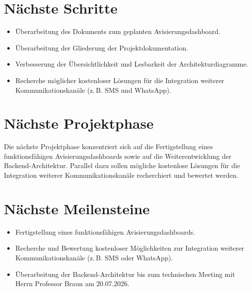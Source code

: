 \documentclass[a4paper,11pt]{article}
\begin{document}
\vspace{0.5cm}

\section{Nächste Schritte}

\begin{itemize}[leftmargin=1.2cm]

\item Überarbeitung des Dokuments zum geplanten Avisierungsdashboard.

\item Überarbeitung der Gliederung der Projektdokumentation.

\item Verbesserung der Übersichtlichkeit und Lesbarkeit der Architekturdiagramme.

\item Recherche möglicher kostenloser Lösungen für die Integration weiterer Kommunikationskanäle (z.\,B. SMS und WhatsApp).

\end{itemize}

\vspace{0.5cm}

\section{Nächste Projektphase}

Die nächste Projektphase konzentriert sich auf die Fertigstellung eines funktionsfähigen Avisierungsdashboards sowie auf die Weiterentwicklung der Backend-Architektur. Parallel dazu sollen mögliche kostenlose Lösungen für die Integration weiterer Kommunikationskanäle recherchiert und bewertet werden.
\vspace{0.5cm}

\section{Nächste Meilensteine}

\begin{itemize}[leftmargin=1.2cm]

\item Fertigstellung eines funktionsfähigen Avisierungsdashboards.

\item Recherche und Bewertung kostenloser Möglichkeiten zur Integration weiterer Kommunikationskanäle (z.\,B. SMS oder WhatsApp).

\item Überarbeitung der Backend-Architektur bis zum technischen Meeting mit Herrn Professor Braun am 20.07.2026.

\end{itemize}
\end{document}
